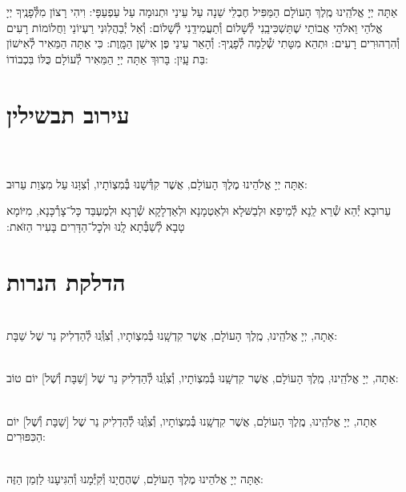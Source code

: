 \documentclass[twoside, openany, parskip=half, 11pt]{book}
\begin{document}
אַתָּה יְיָ אֱלֹהֵֽינוּ מֶֽלֶךְ הָעוֹלָם הַמַּפִּיל חֶבְלֵי שֵׁנָה עַל עֵינַי וּתְנוּמָה עַל עַפְעַפָּי: וִיהִי רָצוֹן מִלְּ֯פָנֶֽיךָ יְיָ אֱלֹהַי וֵאלֹהֵי אֲבוֹתַי שֶׁתַּשְׁכִּיבֵֽנִי לְ֯שָׁלוֹם וְ֯תַעֲמִידֵֽנִי לְ֯שָׁלוֹם: וְ֯אַל יְ֯בַהֲלֽוּנִי רַעְיוֹנַי וַחֲלוֹמוֹת רָעִים וְ֯הִרְהוּרִים רָעִים: וּתְהֵא מִטָּתִי שְׁ֯לֵמָה לְ֯פָנֶֽיךָ: וְ֯הָאֵר עֵינַי פֶּן אִישַׁן הַמָּֽוֶת: כִּי אַתָּה הַמֵּאִיר לְ֯אִישׁוֹן בַּת עָֽיִן: בָּרוּךְ אַתָּה יְיָ הַמֵּאִיר לְ֯עוֹלָם כֻּלּוֹ בִּכְבוֹדוֹ:


\chapter[עירוב תבשילין]{ עירוב תבשילין }

\\
\\
אַתָּה יְיָ אֱלֹהֵינוּ מֶלֶךְ הָעוֹלָם, אֲשֶׁר קִדְּ֯שָׁנוּ בְּ֯מִצְוֹתָיו, וְ֯צִוָּנוּ עַל מִצְוַת עֵרוּב:

עֵרוּבָא יְ֯הֵא שְׁ֯רֵא לַֽנָא לְ֯מֵיפֵא וּלְבַשּּׁלָא וּלְאַטְמָנָא וּלְאַדְלָקָא שְׁ֯רָגָא וּלְמֶעְבַּד כָּל־צָרְ֯כָּנָא, מִיּוֹמָא טָבָא לְ֯שַׁבְּ֯תָא לָֽנוּ וּלְכׇל־הַדָּרִים בָּעִיר הַזּׂאת:‏


\vspace{\baselineskip}
{\let\clearpage\relax
\chapter[הדלקת הנרות שבת ויום טוב]{ הדלקת הנרות }}

\\
אַתָה, יְיָ אֱלֹהֵֽינוּ, מֶֽלֶךְ הָעוֹלָם, אֲשֶׁר קִדְשָֽׁנוּ בְּ֯מִצְוֹתָיו, וְ֯צִוְּֽ֯נוּ לְ֯הַדְלִיק נֵר שֶׁל שַׁבָּת:

\\
אַתָה, יְיָ אֱלֹהֵֽינוּ, מֶֽלֶךְ הָעוֹלָם, אֲשֶׁר קִדְשָֽׁנוּ בְּ֯מִצְוֹתָיו, וְ֯צִוְּֽ֯נוּ לְ֯הַדְלִיק נֵר שֶׁל
[שַׁבָּת וְ֯שֶׁל] יוֹם טוֹב:

\\
אַתָה, יְיָ אֱלֹהֵֽינוּ, מֶֽלֶךְ הָעוֹלָם, אֲשֶׁר קִדְשָֽׁנוּ בְּ֯מִצְוֹתָיו, וְ֯צִוְּֽ֯נוּ לְ֯הַדְלִיק נֵר שֶׁל
[שַׁבָּת וְ֯שֶׁל] יוֹם הַכִּפּוּרִים:

\\
אַתָּה יְיָ אֱלֹהֵינוּ מֶלֶךְ הָעוֹלָם, שֶׁהֶחֱיָנוּ וְ֯קִיְּ֯מָנוּ וְ֯הִגִּיעָנוּ לַזְמַן הַזֶּה:
\end{document}

